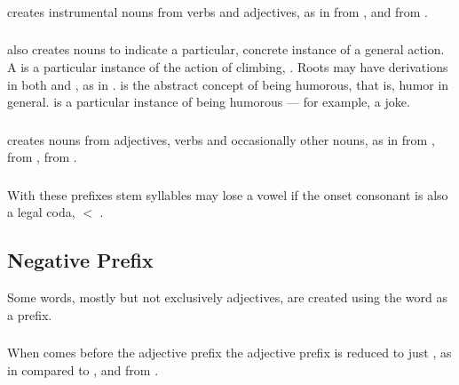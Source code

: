 \subsubsection{}  creates instrumental nouns from verbs and
adjectives, as in   from
, and   from 
. 

\subsubsection{}  also creates nouns to indicate a particular,
concrete instance of a general action. A   is a
particular instance of the action of climbing, .  Roots may
have derivations in both  and , as in 
.   is the abstract concept of being humorous,
that is, humor in general.   is a particular instance of being
humorous --- for example, a joke.\\

\subsubsection{}  creates nouns from adjectives, verbs and
occasionally other nouns, as in   from
 ,   from
 ,   from 
. 

\subsubsection{} With these prefixes stem syllables may lose a vowel
if the onset consonant is also a legal coda, 
 $<$  .


\subsection{Negative Prefix} Some words, mostly but not exclusively
adjectives, are created using the word   as a prefix.

\subsubsection{} When  comes before the adjective prefix
 the adjective prefix is reduced to just , as in
  compared to 
, and   from
 .

